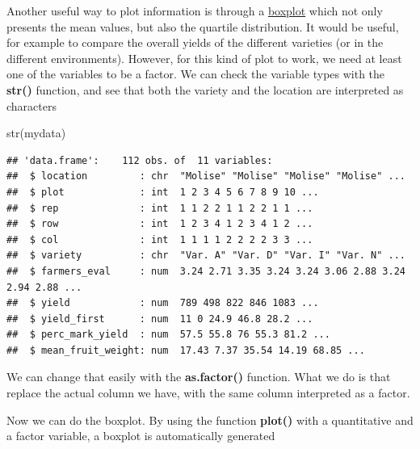\documentclass[
]{book}
\newenvironment{Shaded}{\begin{snugshade}}{\end{snugshade}}
\newcommand{\FunctionTok}[1]{\textcolor[rgb]{0.00,0.00,0.00}{#1}}
\newcommand{\NormalTok}[1]{#1}
\newcommand{\OtherTok}[1]{\textcolor[rgb]{0.56,0.35,0.01}{#1}}
\newcommand{\SpecialCharTok}[1]{\textcolor[rgb]{0.00,0.00,0.00}{#1}}
\begin{document}
Another useful way to plot information is through a \href{https://en.wikipedia.org/wiki/Box_plot}{boxplot} which not only presents the mean values, but also the quartile distribution. It would be useful, for example to compare the overall yields of the different varieties (or in the different environments). However, for this kind of plot to work, we need at least one of the variables to be a factor. We can check the variable types with the \textbf{str() } function, and see that both the variety and the location are interpreted as characters

\begin{Shaded}
\begin{Highlighting}[]
\FunctionTok{str}\NormalTok{(mydata)}
\end{Highlighting}
\end{Shaded}

\begin{verbatim}
## 'data.frame':    112 obs. of  11 variables:
##  $ location         : chr  "Molise" "Molise" "Molise" "Molise" ...
##  $ plot             : int  1 2 3 4 5 6 7 8 9 10 ...
##  $ rep              : int  1 1 2 2 1 1 2 2 1 1 ...
##  $ row              : int  1 2 3 4 1 2 3 4 1 2 ...
##  $ col              : int  1 1 1 1 2 2 2 2 3 3 ...
##  $ variety          : chr  "Var. A" "Var. D" "Var. I" "Var. N" ...
##  $ farmers_eval     : num  3.24 2.71 3.35 3.24 3.24 3.06 2.88 3.24 2.94 2.88 ...
##  $ yield            : num  789 498 822 846 1083 ...
##  $ yield_first      : num  11 0 24.9 46.8 28.2 ...
##  $ perc_mark_yield  : num  57.5 55.8 76 55.3 81.2 ...
##  $ mean_fruit_weight: num  17.43 7.37 35.54 14.19 68.85 ...
\end{verbatim}

We can change that easily with the \textbf{as.factor() } function. What we do is that replace the actual column we have, with the same column interpreted as a factor.

\begin{Shaded}
\end{Shaded}

Now we can do the boxplot. By using the function \textbf{plot() } with a quantitative and a factor variable, a boxplot is automatically generated
\end{document}
